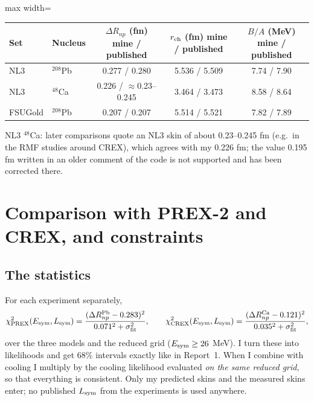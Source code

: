 \documentclass[11pt,a4paper]{article}
\newcommand{\Esym}{E_{\rm sym}}
\newcommand{\Lsym}{L_{\rm sym}}
\newcommand{\DRnp}{\Delta R_{np}}
\begin{document}
\begin{itemize}
\begin{center}
\begin{adjustbox}{max width=\linewidth}
\begin{tabular}{llccc}
\toprule
Set & Nucleus & $\DRnp$ (fm) mine / published & $r_{\rm ch}$ (fm) mine / published & $B/A$ (MeV) mine / published\\
\midrule
NL3 & $^{208}$Pb & 0.277 / 0.280 & 5.536 / 5.509 & 7.74 / 7.90\\
NL3 & $^{48}$Ca & 0.226 / $\approx$0.23--0.245 & 3.464 / 3.473 & 8.58 / 8.64\\
FSUGold & $^{208}$Pb & 0.207 / 0.207 & 5.514 / 5.521 & 7.82 / 7.89\\
\bottomrule
\end{tabular}
\end{adjustbox}
\end{center}
NL3 $^{48}$Ca: later comparisons quote an NL3 skin of about 0.23--0.245 fm (e.g.\ in the RMF studies around CREX), which agrees with my 0.226 fm; the value 0.195 fm written in an older comment of the code is not supported and has been corrected there.
\end{itemize}

\section{Comparison with PREX-2 and CREX, and constraints}
\subsection{The statistics}
For each experiment separately,
\begin{equation}
\chi^2_{\rm PREX}(\Esym,\Lsym)=\frac{(\DRnp^{\rm Pb}-0.283)^2}{0.071^2+\sigma_{\rm fit}^2},\qquad
\chi^2_{\rm CREX}(\Esym,\Lsym)=\frac{(\DRnp^{\rm Ca}-0.121)^2}{0.035^2+\sigma_{\rm fit}^2},
\end{equation}
over the three models and the reduced grid ($\Esym\ge26$ MeV). I turn these into likelihoods and get 68\% intervals exactly like in Report~1. When I combine with cooling I multiply by the cooling likelihood evaluated \emph{on the same reduced grid}, so that everything is consistent. Only my predicted skins and the measured skins enter; no published $\Lsym$ from the experiments is used anywhere.
\end{document}
